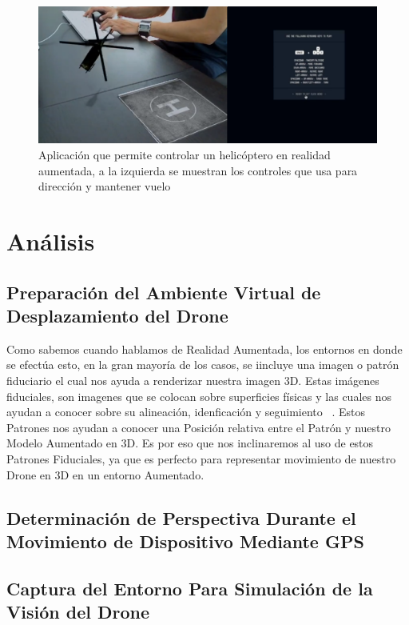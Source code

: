 \documentclass[a4paper]{article}
\begin{document}
\begin{figure}[h!]
  \centering
  \includegraphics[width=0.95\linewidth, keepaspectratio]{helicopteroAR}
  \caption{Aplicación que permite controlar un helicóptero en realidad aumentada, a la izquierda se muestran los controles que usa para dirección y mantener vuelo}
  \label{fig:Helicoptero AR}
\end{figure}

\section{Análisis}
\subsection{Preparación del Ambiente Virtual de Desplazamiento del Drone}
Como sabemos cuando hablamos de Realidad Aumentada, los entornos en donde se efectúa esto, en la gran mayoría de los casos, se iincluye una imagen o patrón fiduciario el cual nos ayuda a renderizar nuestra imagen 3D. Estas imágenes fiduciales, son imagenes que se colocan sobre superficies físicas y las cuales nos ayudan a conocer sobre su alineación, idenficación y seguimiento ~\cite{bestfiducial}. Estos Patrones nos ayudan a conocer una Posición relativa entre el Patrón y nuestro Modelo Aumentado en 3D. Es por eso que nos inclinaremos al uso de estos Patrones Fiduciales, ya que es perfecto para representar movimiento de nuestro Drone en 3D en un entorno Aumentado.
\subsection{Determinación de Perspectiva Durante el Movimiento de Dispositivo Mediante GPS}
\subsection{Captura del Entorno Para Simulación de la Visión del Drone}
\end{document}
